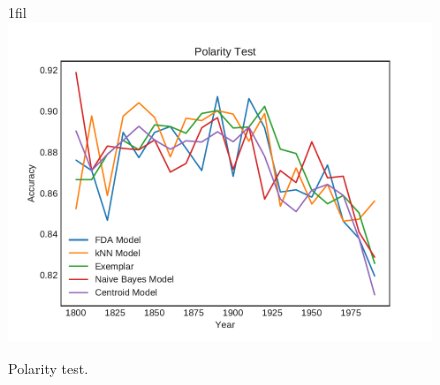 \documentclass{article}
\makeatletter
\newcommand*{\centerfloat}{%
  \parindent \z@
  \leftskip \z@ \@plus 1fil \@minus \textwidth
  \rightskip\leftskip
  \parfillskip \z@skip}
\makeatother
\begin{document}
\begin{figure}
    \centerfloat
    \includegraphics[width=1.75\linewidth]{results_polarity_test.pdf}
    \caption{Polarity test.}
\end{figure}
\end{document}
